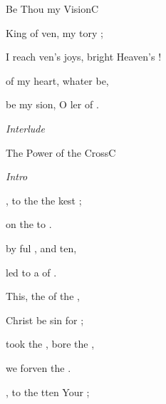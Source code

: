 \documentclass[12pt]{book}
\begin{document}
\begin{song}{Be Thou my Vision}{C}{}{}{}{}
\begin{SBExtraKeys}
{  \begin{SBVerse}
     King of ven, my tory ;

     I reach ven's joys,  bright Heaven's !

     of my  heart, whater be,

     be my sion, O ler of .

    \emph{Interlude} \Ch{[}{}    \Ch{]}{}
  \end{SBVerse}

  }\end{SBExtraKeys}
\end{song}

\begin{song}{The Power of the Cross}{C}{}{}{}{}

    \emph{Intro} \Ch{[Am}{}  \Ch{C]x2}{}
    \begin{SBVerse}
        
        , to  the  
             the kest ; 

         on the  to 
            .

         by ful , 
             and ten, 

        led to a  of .

    \end{SBVerse}

    \begin{SBChorus}

        This, the  of the ,

        Christ be sin for ;

        took the , bore the ,

        we  forven  the . 
            \Ch{[Am}{}  \Ch{C]}{}

    \end{SBChorus}

    \begin{SBVerse}
        
        , to  the  
            tten  Your ; 


\end{SBVerse}
\end{song}
\end{document}
